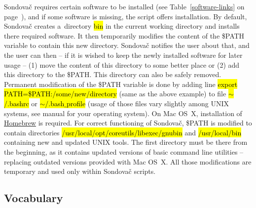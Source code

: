 \documentclass[a4paper, 11pt, twoside]{article}
\renewcommand{\texttt}[1]{\hl{\ttfamily #1}}
\begin{document}
Sondovač requires certain software to be installed (see Table~\ref{software-links} on page~\pageref{software-links}), and if some software is missing, the script offers installation. By default, Sondovač creates a~directory \texttt{bin} in the current working directory and installs there required software. It then temporarily modifies the content of the \$PATH variable to contain this new directory. Sondovač notifies the user about that, and the user can then -- if it is wished to keep the newly installed software for later usage -- (1) move the content of this directory to some better place or (2) add this directory to the \$PATH. This directory can also be safely removed. Permanent modification of the \$PATH variable is done by adding line \texttt{export PATH=\$PATH:/some/new/directory} (same as the above example) to file \texttt{$\sim$/.bashrc} or \texttt{$\sim$/.bash$\_$profile} (usage of those files vary slightly among UNIX systems, see manual for your operating system). On Mac OS~X, installation of \href{http://brew.sh/}{Homebrew} is required. For correct functioning of Sondovač, \$PATH is modified to contain directories \texttt{/usr/local/opt/coreutils/libexec/gnubin} and \texttt{/usr/local/bin} containing new and updated UNIX tools. The first directory must be there from the beginning, as it contains updated versions of basic command line utilities -- replacing outdated versions provided with Mac OS~X. All those modifications are temporary and used only within Sondovač scripts.

\subsection{Vocabulary}
\label{vocabulary}
\end{document}

